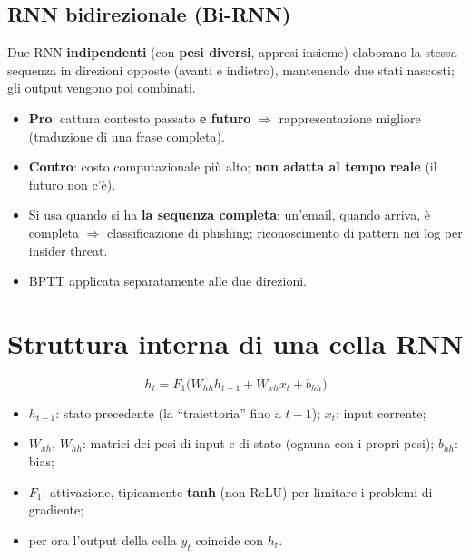 \subsection{RNN bidirezionale (Bi-RNN)}
Due RNN \textbf{indipendenti} (con \textbf{pesi diversi}, appresi insieme) elaborano la stessa sequenza in direzioni opposte
(avanti e indietro), mantenendo due stati nascosti; gli output vengono poi combinati.
\begin{itemize}
  \item \textbf{Pro}: cattura contesto passato \textbf{e futuro} $\Rightarrow$ rappresentazione migliore (traduzione di una frase completa).
  \item \textbf{Contro}: costo computazionale più alto; \textbf{non adatta al tempo reale} (il futuro non c'è).
  \item Si usa quando si ha \textbf{la sequenza completa}: un'email, quando arriva, è completa $\Rightarrow$ classificazione di
        phishing; riconoscimento di pattern nei log per insider threat.
  \item BPTT applicata separatamente alle due direzioni.
\end{itemize}

\section{Struttura interna di una cella RNN}
\[
h_t = F_1\big(W_{hh}h_{t-1} + W_{xh}x_t + b_{hh}\big)
\]
\begin{itemize}
  \item $h_{t-1}$: stato precedente (la ``traiettoria'' fino a $t-1$); $x_t$: input corrente;
  \item $W_{xh}$, $W_{hh}$: matrici dei pesi di input e di stato (ognuna con i propri pesi); $b_{hh}$: bias;
  \item $F_1$: attivazione, tipicamente \textbf{tanh} (non ReLU) per limitare i problemi di gradiente;
  \item per ora l'output della cella $y_t$ coincide con $h_t$.
\end{itemize}

